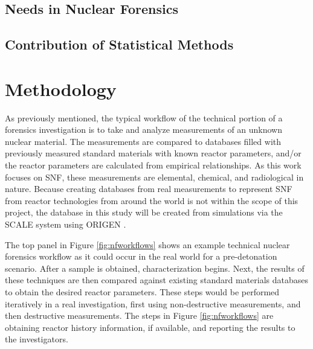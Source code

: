 \subsection{Needs in Nuclear Forensics}

\label{sec:nfneeds}

\subsection{Contribution of Statistical Methods}

\label{sec:statscontrib}

\section{Methodology}
\label{sec:methodology}

As previously mentioned, the typical workflow of the technical portion of a
forensics investigation is to take and analyze measurements of an unknown
nuclear material. The measurements are compared to databases filled with
previously measured standard materials with known reactor parameters, and/or
the reactor parameters are calculated from empirical relationships.  As this
work focuses on \gls{SNF}, these measurements are elemental, chemical, and
radiological in nature.  Because creating databases from real measurements to
represent \gls{SNF} from reactor technologies from around the world is not
within the scope of this project, the database in this study will be created
from simulations via the \gls{SCALE} \cite{scale} system using \gls{ORIGEN}
\cite{origen}. 

The top panel in Figure \ref{fig:nfworkflows} shows an example technical nuclear
forensics workflow as it could occur in the real world for a pre-detonation
scenario.  After a sample is obtained, characterization begins.  Next, the
results of these techniques are then compared against existing standard
materials databases to obtain the desired reactor parameters. These steps would
be performed iteratively in a real investigation, first using non-destructive
measurements, and then destructive measurements.  The steps in Figure
\ref{fig:nfworkflows} are obtaining reactor history information, if available,
and reporting the results to the investigators. 

